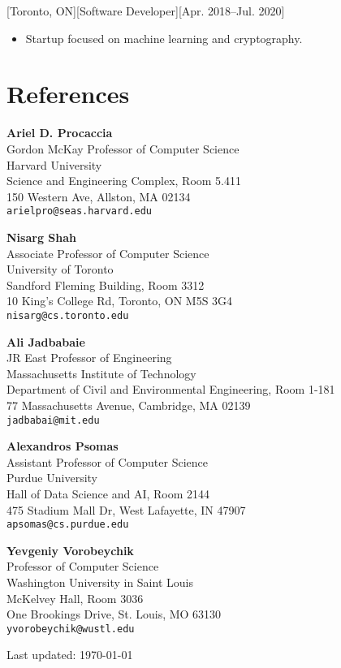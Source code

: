 \documentclass{article}
\begin{document}
    
    [Toronto, ON][Software Developer][Apr. 2018--Jul. 2020]
    \begin{itemize}[noitemsep,nolistsep]
        \item Startup focused on machine learning and cryptography. 
    \end{itemize}
    

\section{References}


\textbf{Ariel D. Procaccia} \\
Gordon McKay Professor of Computer Science \\
Harvard University \\
Science and Engineering Complex, Room 5.411\\
150 Western Ave, Allston, MA 02134 \\
\texttt{arielpro@seas.harvard.edu}
\medbreak

\textbf{Nisarg Shah} \\
Associate Professor of Computer Science\\
University of Toronto \\
Sandford Fleming Building, Room 3312\\
10 King's College Rd, Toronto, ON M5S 3G4 \\
\texttt{nisarg@cs.toronto.edu}
\medbreak


\textbf{Ali Jadbabaie} \\
JR East Professor of Engineering \\
Massachusetts Institute of Technology \\
Department of Civil and Environmental Engineering, Room 1-181\\
77 Massachusetts Avenue, Cambridge, MA 02139 \\
\texttt{jadbabai@mit.edu}
\medbreak

\textbf{Alexandros Psomas} \\
Assistant Professor of Computer Science \\
Purdue University \\
Hall of Data Science and AI, Room 2144\\
475 Stadium Mall Dr, West Lafayette, IN 47907 \\
\texttt{apsomas@cs.purdue.edu}
\medbreak

\textbf{Yevgeniy Vorobeychik} \\
Professor of Computer Science\\
Washington University in Saint Louis \\
McKelvey Hall, Room 3036\\
One Brookings Drive, St. Louis, MO 63130 \\
\texttt{yvorobeychik@wustl.edu}


    \vfill
\begin{center}
    Last updated: \today
\end{center}
    
\end{document}
